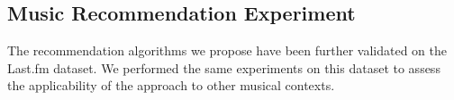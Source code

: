 \subsection{Music Recommendation Experiment}
The recommendation algorithms we propose have been further validated on the Last.fm dataset. We performed the same experiments on this dataset to assess the applicability of the approach to other musical contexts.
